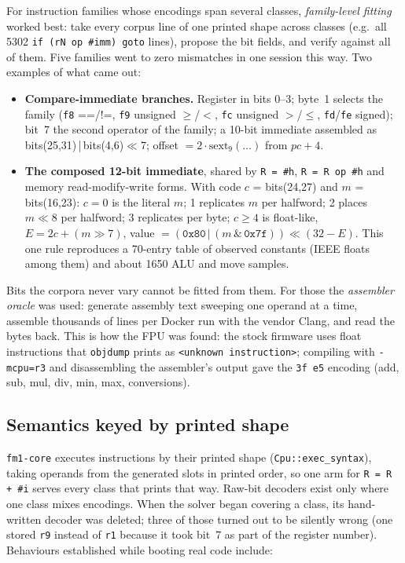 \documentclass[10pt,a4paper]{article}
\newcommand{\code}[1]{\texttt{#1}}
\begin{document}
For instruction families whose encodings span several classes, \emph{family-level fitting} worked
best: take every corpus line of one printed shape across classes (e.g.\ all 5302
\code{if (rN op \#imm) goto} lines), propose the bit fields, and verify against all of them. Five
families went to zero mismatches in one session this way. Two examples of what came out:

\begin{itemize}
\item \textbf{Compare-immediate branches.} Register in bits 0--3; byte~1 selects the family
  (\code{f8} ==/!=, \code{f9} unsigned $\ge$/$<$, \code{fc} unsigned $>$/$\le$, \code{fd}/\code{fe}
  signed); bit~7 the second operator of the family; a 10-bit immediate assembled as
  bits(25,31)\,|\,bits(4,6)$\ll$7; offset $=2\cdot\mathrm{sext}_9(\ldots)$ from $pc+4$.
\item \textbf{The composed 12-bit immediate}, shared by \code{R = \#h}, \code{R = R op \#h} and
  memory read-modify-write forms. With code $c$ = bits(24,27) and $m$ = bits(16,23): $c=0$ is the
  literal $m$; 1 replicates $m$ per halfword; 2 places $m\ll8$ per halfword; 3 replicates per
  byte; $c\ge4$ is float-like, $E = 2c + (m\gg7)$, value $=(\mathtt{0x80}\,|\,(m\,\&\,\mathtt{0x7f}))\ll(32-E)$.
  This one rule reproduces a 70-entry table of observed constants (IEEE floats among them) and
  about 1650 ALU and move samples.
\end{itemize}

Bits the corpora never vary cannot be fitted from them. For those the \emph{assembler oracle} was
used: generate assembly text sweeping one operand at a time, assemble thousands of lines per Docker
run with the vendor Clang, and read the bytes back. This is how the FPU was found: the stock
firmware uses float instructions that \code{objdump} prints as \code{<unknown instruction>}; compiling
with \code{-mcpu=r3} and disassembling the assembler's output gave the \code{3f e5} encoding
(add, sub, mul, div, min, max, conversions).

\subsection{Semantics keyed by printed shape}
\code{fm1-core} executes instructions by their printed shape (\code{Cpu::exec\_syntax}), taking
operands from the generated slots in printed order, so one arm for \code{R = R + \#i} serves every
class that prints that way. Raw-bit decoders exist only where one class mixes encodings. When the
solver began covering a class, its hand-written decoder was deleted; three of those turned out to be
silently wrong (one stored \code{r9} instead of \code{r1} because it took bit~7 as part of the
register number). Behaviours established while booting real code include:
\end{document}
